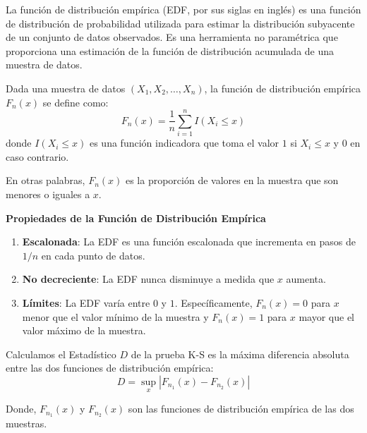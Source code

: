 \documentclass[
  letterpaper,
  DIV=11,
  numbers=noendperiod]{scrreprt}
\providecommand{\tightlist}{%
  \setlength{\itemsep}{0pt}\setlength{\parskip}{0pt}}\usepackage{longtable,booktabs,array}
\begin{document}
\begin{tcolorbox}[enhanced jigsaw, arc=.35mm, breakable, coltitle=black, left=2mm, opacityback=0, bottomtitle=1mm, colbacktitle=quarto-callout-note-color!10!white, title=\textcolor{quarto-callout-note-color}{\faInfo}\hspace{0.5em}{Función de Distribución Empírica}, titlerule=0mm, colback=white, colframe=quarto-callout-note-color-frame, bottomrule=.15mm, rightrule=.15mm, opacitybacktitle=0.6, toptitle=1mm, toprule=.15mm, leftrule=.75mm]

La función de distribución empírica (EDF, por sus siglas en inglés) es
una función de distribución de probabilidad utilizada para estimar la
distribución subyacente de un conjunto de datos observados. Es una
herramienta no paramétrica que proporciona una estimación de la función
de distribución acumulada de una muestra de datos.

Dada una muestra de datos \((X_1, X_2, \ldots, X_n)\), la función de
distribución empírica \(F_n(x)\) se define como: \[
 F_n(x) = \frac{1}{n} \sum_{i=1}^{n} I(X_i \leq x) 
\] donde \(I(X_i \leq x)\) es una función indicadora que toma el valor
\(1\) si \(X_i \leq x\) y \(0\) en caso contrario.

En otras palabras, \(F_n(x)\) es la proporción de valores en la muestra
que son menores o iguales a \(x\).

\textbf{Propiedades de la Función de Distribución Empírica}

\begin{enumerate}
\def\labelenumi{\arabic{enumi}.}
\tightlist
\item
  \textbf{Escalonada}: La EDF es una función escalonada que incrementa
  en pasos de \(1/n\) en cada punto de datos.
\item
  \textbf{No decreciente}: La EDF nunca disminuye a medida que \(x\)
  aumenta.
\item
  \textbf{Límites}: La EDF varía entre \(0\) y \(1\). Específicamente,
  \(F_n(x) = 0\) para \(x\) menor que el valor mínimo de la muestra y
  \(F_n(x) = 1\) para \(x\) mayor que el valor máximo de la muestra.
\end{enumerate}

\end{tcolorbox}

Calculamos el Estadístico \(D\) de la prueba K-S es la máxima diferencia
absoluta entre las dos funciones de distribución empírica: \[
     D = \sup_x |F_{n_1}(x) - F_{n_2}(x)|
\]

Donde, \(F_{n_1}(x)\) y \(F_{n_2}(x)\) son las funciones de distribución
empírica de las dos muestras.
\end{document}
